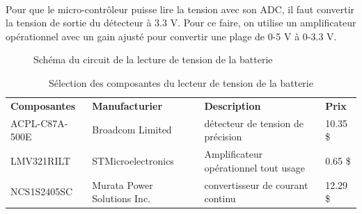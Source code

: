 	\paragraph*{}	
	Pour que le micro-contrôleur puisse lire la tension avec son ADC, il faut convertir la tension de sortie du détecteur à 3.3 V. Pour ce faire, on utilise un amplificateur opérationnel avec un gain ajusté pour convertir une plage de 0-5 V à 0-3.3 V.
	
	\begin{figure}
		\centering
		\caption{Schéma du circuit de la lecture de tension de la batterie}
		\label{fig:schemalecturetension}
	\end{figure}
	
	\begin{table}[H]
		\centering
		\caption{Sélection des composantes du lecteur de tension de la batterie}
		\label{SelectionSenseVoltageBat}
		\begin{tabular}{|p{3cm}|p{3.5cm}|p{6cm}|p{1.5cm}|}
			\hline
			\textbf{Composantes} & \textbf{Manufacturier} & \textbf{Description} & \textbf{Prix}
			\\ \hhline{|=|=|=|=|}
			ACPL-C87A-500E & Broadcom Limited & détecteur de tension de précision & 10.35 \$	\\ \hline
			LMV321RILT & STMicroelectronics & Amplificateur opérationnel tout usage & 0.65 \$	\\ \hline
			NCS1S2405SC & Murata Power Solutions Inc. & convertisseur de courant continu & 12.29 \$	\\ \hline
		\end{tabular}
	\end{table} 